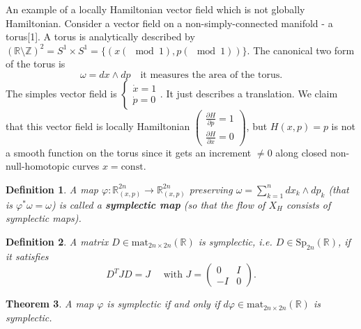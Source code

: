 \documentclass[hidelinks,a4paper, 11pt]{article}
\theoremstyle{plain}
\newtheorem{theorem}{Theorem}
\theoremstyle{break}
\theoremstyle{plain}
\newtheorem{definition}[theorem]{Definition}
\theoremstyle{definition}
\begin{document}
{An example of a locally Hamiltonian vector field which is not globally Hamiltonian. Consider a vector field on a non-simply-connected manifold - a torus[1]. A torus is analytically described by $(\mathbb R \setminus \mathbb Z)^2 = S^1 \times S^1 = \{ (x(\mod 1), p(\mod 1))  \}$. The canonical two form of the torus is 
\[
\omega = dx \wedge dp \quad \text{it measures the area of the torus.}
\]
The simples vector field is $\begin{cases}
\dot x =1 \\ \dot p = 0
\end{cases}$. It just describes a translation. We claim that this vector field is locally Hamiltonian $\begin{pmatrix}
\frac{\partial H}{\partial p} = 1 \\ \frac{\partial H}{\partial x} = 0
\end{pmatrix}$, but $H(x,p) = p$ is not a smooth function on the torus since it gets an increment $\neq 0$ along closed non-null-homotopic curves $x = \mathrm{const}$.

\begin{definition}
	A map $\varphi: \mathbb R^{2n}_{(x,p)} \to \mathbb R^{2n}_{(x,p)}$ preserving $\omega = \sum^n_{k=1} dx_k \wedge dp_k$ (that is $\varphi^* \omega = \omega$) is called a \textbf{symplectic map} (so that the flow of $X_H$ consists of symplectic maps).
\end{definition}

\begin{definition}
	A matrix $D \in \mathrm{mat}_{2n \times 2n} (\mathbb R)$ is symplectic, i.e. $D \in \mathrm{Sp}_{2n}(\mathbb R)$, if it satisfies 
	\[
	D^TJD = J \quad \text{ with $J = \begin{pmatrix}
		0 & I \\ -I & 0
		\end{pmatrix}$}.
	\]
	
\end{definition}

\begin{theorem}
	A map $\varphi$ is symplectic if and only if $d \varphi \in \mathrm{mat}_{2n \times 2n}(\mathbb R)$ is symplectic.
\end{theorem}

}
\end{document}
